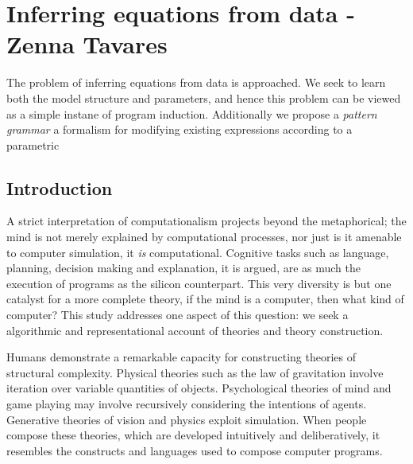 
\chapter{Inferring equations from data - Zenna Tavares} %
The problem of inferring equations from data is approached.
We seek to learn both the model structure and parameters, and hence this problem can be viewed as a simple instane of program induction.
Additionally we propose a \textit{pattern grammar} a formalism for modifying existing expressions according to a parametric

\section{Introduction} %

\label{ch:examples} %

A strict interpretation of computationalism projects beyond the metaphorical; the mind is not merely explained by computational processes, nor just is it amenable to computer simulation, it {\em is} computational.
Cognitive tasks such as language, planning, decision making and explanation, it is argued, are as much the execution of programs as the silicon counterpart.
This very diversity is but one catalyst for a more complete theory, if the mind is a computer, then what kind of computer?
This study %
addresses one aspect of this question: we seek a algorithmic and representational account of theories and theory construction.

Humans %
demonstrate
a remarkable capacity for constructing theories of structural complexity.
Physical theories such as the law of gravitation involve iteration over variable quantities of objects. Psychological theories of mind and game playing may involve recursively considering the intentions of agents.  Generative theories of vision and physics exploit simulation.
When people compose these theories, which are developed intuitively and deliberatively, it resembles the constructs and languages used to compose computer programs.

